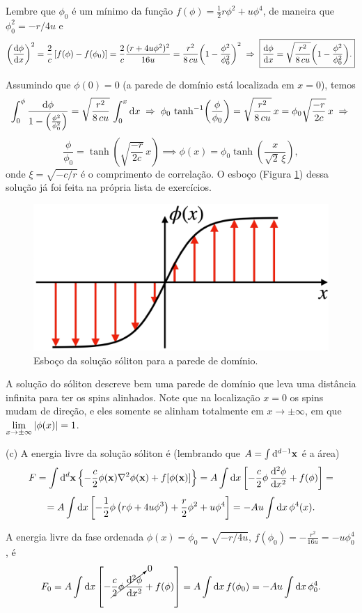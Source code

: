 \documentclass[a4paper,10pt]{article}
\begin{document}
Lembre que $\phi_0$ é um mínimo da função $f(\phi) =  \frac{1}{2} r \phi^2 + u \phi^4$, de maneira que $\phi_0^2 = -r/4u$ e
$$
\qty(\dv{\phi}{x})^2 = \frac{2}{c} \, [f(\phi) - f(\phi_0)] = \frac{2}{c} \frac{(r + 4 u \phi^2)^2}{16 u}
= \frac{r^2}{8 \, cu} \qty(1 - \frac{\phi^2}{\phi_0^2} )^2 \; \Rightarrow \;
\boxed{ \dv{\phi}{x} = \sqrt{\frac{r^2}{8 \, cu}} \qty( 1 - \frac{\phi^2}{\phi_0^2} ). }
$$

Assumindo que $\phi(0) = 0$ (a parede de domínio está localizada em $x = 0$), temos
$$
\int_0^{\phi} \frac{\dd{\phi}}{1 - \qty(\frac{\phi^2}{\phi_0^2}) } = \sqrt{\frac{r^2}{8 \, cu}} \, \int_0^x \dd{x} \; \Rightarrow \;
\phi_0 \, \tanh[-1](\frac{\phi}{\phi_0}) = \sqrt{\frac{r^2}{8 \, cu}} \, x = \phi_0 \sqrt{\frac{-r}{2c}} \, x \; \Rightarrow \;
$$
$$
\frac{\phi}{\phi_0} = \tanh(\sqrt{\frac{-r}{2c}} \, x) \implies
\boxed{ \phi(x) = \phi_0 \tanh(\frac{x}{\sqrt{2} \, \xi}), }
$$
onde $\xi = \sqrt{-c/r}$ é o comprimento de correlação. O esboço (Figura \ref{fig:soliton}) dessa solução já foi feita na própria lista de exercícios.
\begin{figure}[H]
\centering
\includegraphics[width=0.6\linewidth]{fig/soliton.png}
\caption{Esboço da solução sóliton para a parede de domínio.}
\label{fig:soliton}
\end{figure}

A solução do sóliton descreve bem uma parede de domínio que leva uma distância infinita para ter os spins alinhados. Note que na localização $x = 0$ os spins mudam de direção, e eles somente se alinham totalmente em $x \to \pm \infty$, em que $\displaystyle{\lim_{x\to\pm\infty} \abs{\phi(x)} = 1}$.

\n

(c) A energia livre da solução sóliton é (lembrando que $A = \int \dd[d-1]{\vb{x}}$ é a área)
$$
F = \int \dd[d]{\vb{x}} \qty{-\frac{c}{2} \phi(\vb{x}) \nabla^2 \phi(\vb{x}) + f[\phi(\vb{x})]} =
A \int \dd{x} \qty[-\frac{c}{2} \phi \, \dv[2]{\phi}{x} + f(\phi)] =
$$
$$
= A \int \dd{x} \qty[-\frac{1}{2} \phi \, \qty(r\phi + 4u \phi^3) + \frac{r}{2} \phi^2 + u \phi^4]
= -Au \int \dd{x} \phi^4(x).
$$

A energia livre da fase ordenada $\phi(x) = \phi_0 = \sqrt{-r/4u}$, $f(\phi_0) = -\frac{r^2}{16u} = -u \phi_0^4$, é
$$
F_0 = A \int \dd{x} \qty[-\cancelto{0}{\frac{c}{2} \phi \, \dv[2]{\phi}{x}} + f(\phi)] = A \int \dd{x} f(\phi_0) =
-A u \int \dd{x} \phi_0^4.
$$
\end{document}

